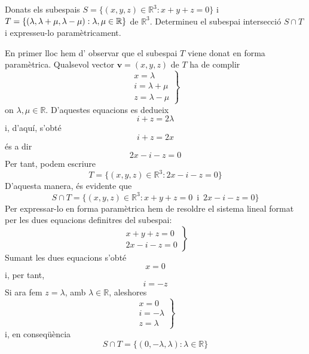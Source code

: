 \begin{exercici}
Donats els subespais $S=\{(x,y,z)\in \mathbb{R}^{3}:x+y+z=0\}$ i $%
T=\{(\lambda ,\lambda +\mu ,\lambda -\mu ):\lambda ,\mu \in \mathbb{%
R}\}$ de $\mathbb{R}^{3}$. Determineu el subespai intersecció $%
S\cap T$ i expresseu-lo paramètricament.

\end{exercici}
\begin{solucio}
En primer lloc hem d’ observar que el subespai $T$ viene donat
en forma paramètrica. Qualsevol vector $\mathbf{v}=(x,y,z)$ de $T$ ha de complir%
\begin{equation*}
\left.
\begin{array}{l}
x=\lambda \\
{i=\lambda +\mu } \\
{z=\lambda -\mu }%
\end{array}%
\right\}
\end{equation*}%
on $\lambda ,\mu \in \mathbb{R}$. D’aquestes equacions es dedueix%
\begin{equation*}
{i+z=2\lambda }
\end{equation*}%
i, d’aquí, s’obté%
\begin{equation*}
i+z=2x
\end{equation*}%
és a dir%
\begin{equation*}
2x-i-z=0
\end{equation*}%
Per tant, podem escriure%
\begin{equation*}
T=\{(x,y,z)\in \mathbb{R}^{3}:2x-i-z=0\}
\end{equation*}%
D’aquesta manera, és evidente que%
\begin{equation*}
S\cap T=\{(x,y,z)\in \mathbb{R}^{3}:x+y+z=0\,\text{ i }%
\,2x-i-z=0\}
\end{equation*}%
Per expressar-lo en forma paramètrica hem de resoldre el sistema lineal
format per les dues equacions definitres del subespai:%
\begin{equation*}
\left.
\begin{array}{r}
x+y+z=0 \\
2x-i-z=0%
\end{array}%
\right\}
\end{equation*}%
Sumant les dues equacions s’obté%
\begin{equation*}
x=0
\end{equation*}%
i, per tant,%
\begin{equation*}
i=-z
\end{equation*}%
Si ara fem $z=\lambda $, amb $\lambda \in \mathbb{R}$, aleshores%
\begin{equation*}
\left.
\begin{array}{l}
x=0 \\
i=-\lambda \\
z=\lambda%
\end{array}%
\right\}
\end{equation*}%
i, en conseqüència%
\begin{equation*}
S\cap T=\{(0,-\lambda ,\lambda ):\lambda \in \mathbb{R}\}
\end{equation*}
\end{solucio}

